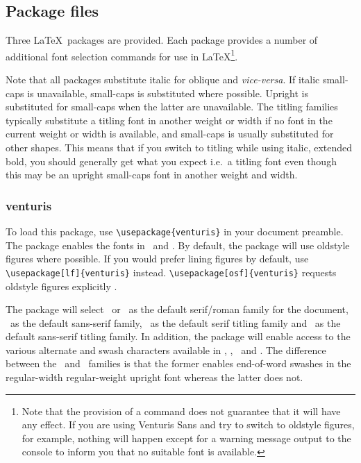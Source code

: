 \documentclass[11pt,british]{article}
\begin{document}
\subsection{Package files}

Three \LaTeX\ packages are provided. Each package provides a number of additional font selection commands for use in \LaTeX\footnote{Note that the provision of a command does not guarantee that it will have any effect. If you are using Venturis Sans and try to switch to oldstyle figures, for example, nothing will happen except for a warning message output to the console to inform you that no suitable font is available.}.

Note that all packages substitute italic for oblique and \emph{vice-versa}. If italic small-caps is unavailable, small-caps is substituted where possible. Upright is substituted for small-caps when the latter are unavailable. The titling families typically substitute a titling font in another weight or width if no font in the current weight or width is available, and small-caps is usually substituted for other shapes. This means that if you switch to titling while using italic, extended bold, you should generally get what you expect i.e.\ a titling font even though this may be an upright small-caps font in another weight and width.

\subsubsection{venturis}\label{sec:venturis}
	
	To load this package, use \verb|\usepackage{venturis}| in your document preamble. The package enables the fonts in \ and . By default, the package will use oldstyle figures where possible. If you would prefer lining figures by default, use \verb|\usepackage[lf]{venturis}| instead. \verb|\usepackage[osf]{venturis}| requests oldstyle figures explicitly .
	
	The package will select \ or \ as the default serif/roman family for the document, \ as the default sans-serif family, \ as the default serif titling family and \ as the default sans-serif titling family.  In addition, the package will enable access to the various alternate and swash characters available in , , \ and . The difference between the \ and \ families is that the former enables end-of-word swashes in the regular-width regular-weight upright font whereas the latter does not.
	
\end{document}
